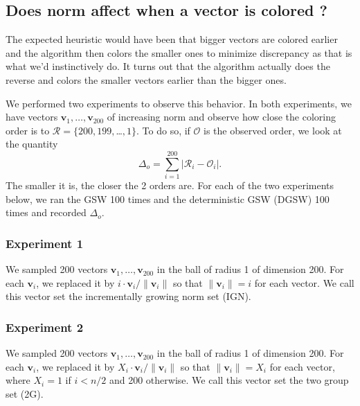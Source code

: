 \documentclass[12pt]{article}
\begin{document}
\subsection{Does norm affect when a vector is colored ?}\label{norm_affect_when}
The expected heuristic would have been that bigger vectors are colored earlier and the algorithm then colors the smaller ones to minimize discrepancy as that is what we'd instinctively do. It turns out that the algorithm actually does the reverse and colors the smaller vectors earlier than the bigger ones.

We performed two experiments to observe this behavior. In both experiments, we have vectors $\textbf{v}_1,\dots,\textbf{v}_{200}$ of increasing norm and observe how close the coloring order is to $\mathcal{R}=\{200,199,$\dots$,1\}$. To do so, if $\mathcal{O}$ is the observed order, we look at the quantity 
\begin{equation}
\Delta_{o}=\sum_{i=1}^{200}|\mathcal{R}_i-\mathcal{O}_i|.
\label{orderdistance}
\end{equation}
The smaller it is, the closer the 2 orders are. For each of the two experiments below, we ran the GSW 100 times and the deterministic GSW (DGSW) 100 times and recorded $\Delta_o$.

\subsubsection{Experiment 1}
We sampled 200 vectors $\textbf{v}_1,\dots,\textbf{v}_{200}$ in the ball of radius 1 of dimension 200. For each $\textbf{v}_i$, we replaced it by $i\cdot \textbf{v}_i/\|\textbf{v}_i\|$ so that $\|\textbf{v}_i\|=i$ for each vector. We call this vector set the incrementally growing norm set (IGN).


\subsubsection{Experiment 2}
We sampled 200 vectors $\textbf{v}_1,\dots,\textbf{v}_{200}$ in the ball of radius 1 of dimension 200. For each $\textbf{v}_i$, we replaced it by $X_i\cdot \textbf{v}_i/\|\textbf{v}_i\|$ so that $\|\textbf{v}_i\|=X_i$ for each vector, where $X_i=1$ if $i<n/2$ and 200 otherwise. We call this vector set the two group set (2G).
\end{document}
